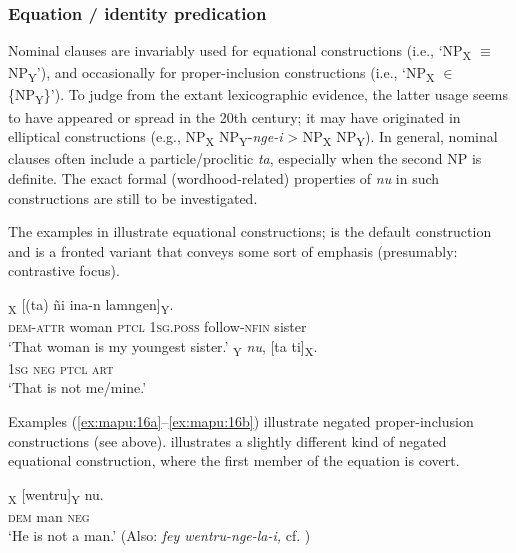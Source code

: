 \documentclass[output=paper,colorlinks,citecolor=brown,draft]{langscibook}
\begin{document}
\subsubsection{Equation / identity predication}
\label{sec:mapu:2.3.6}

Nominal clauses are invariably used for equational constructions (i.e., ‘NP\textsubscript{X} ${\equiv}$ NP\textsubscript{Y}’), and occasionally for proper-inclusion constructions (i.e., ‘NP\textsubscript{X} ${\in}$ \{NP\textsubscript{Y}\}’). To judge from the extant lexicographic evidence, the latter usage seems to have appeared or spread in the 20th century; it may have originated in elliptical constructions (e.g., NP\textsubscript{X} NP\textsubscript{Y}{}-\textit{nge-i} > NP\textsubscript{X} NP\textsubscript{Y}). In general, nominal clauses often include a particle/proclitic \textit{ta}, especially when the second NP is definite. The exact formal (wordhood-related) properties of \textit{nu} in such constructions are still to be investigated.


The examples in  illustrate equational constructions;  is the default construction and  is a fronted variant that conveys some sort of emphasis (presumably: contrastive focus).

\ea\label{ex:mapu:15}
    \ea\label{ex:mapu:15a}
        \textsubscript{X} [(ta) ñi ina-n lamngen]\textsubscript{Y}.\\
             \textsc{dem-attr} woman \textsc{ptcl} \textsc{1sg.poss} follow-\textsc{nfin} sister \\
        \glt ‘That woman is my youngest sister.’ \citep[143]{Smeets2008} 
    \ex\label{ex:mapu:15b}
        \gll [Iñche]\textsubscript{Y} \textit{nu}, [ta ti]\textsubscript{X}. \\
            \textsc{1sg} \textsc{neg} \textsc{ptcl} \textsc{art} \\
        \glt ‘That is not me/mine.’ \citep[144]{Smeets2008}
    \z
\z 

Examples (\ref{ex:mapu:16a}--\ref{ex:mapu:16b}) illustrate negated proper-inclusion constructions (see  above).  illustrates a slightly different kind of negated equational construction, where the first member of the equation is covert.

\ea\label{ex:mapu:16}    
    \ea\label{ex:mapu:16a}
        \textsubscript{X} [wentru]\textsubscript{Y} nu. \\ 
             \textsc{dem} man \textsc{neg} \\
        \glt ‘He is not a man.’ \citep[144]{Smeets2008} (Also: \textit{fey wentru-nge-la-i,} cf. )
    
\end{document}
